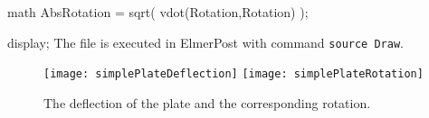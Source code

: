 math AbsRotation = sqrt( vdot(Rotation,Rotation) );

display;
\ttend
The file is executed in ElmerPost with command {\tt source Draw}.
%
\begin{figure}[tbhp]
\begin{center}
\texttt{[image: simplePlateDeflection]}
\texttt{[image: simplePlateRotation]}
\end{center}
\caption{The deflection of the plate and the corresponding rotation.}
\label{fig:simplePlateDeflection}
\end{figure}
%

